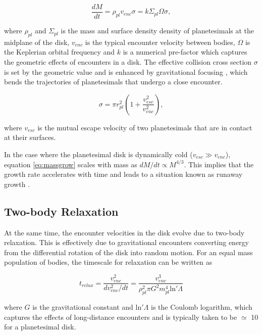 \begin{equation}\label{eq:massgrow}
	\frac{dM}{dt} = \rho_{pl} v_{enc} \sigma = k \Sigma_{pl} \Omega \sigma,
\end{equation}

\noindent where $\rho_{pl}$ and $\Sigma_{pl}$ is the mass and surface density density of planetesimals at the midplane of the disk, $v_{enc}$ is the typical encounter velocity between bodies, $\Omega$ is the Keplerian orbital frequency and $k$ is a numerical pre-factor which captures the geometric effects of encounters in a disk. The effective collision cross section $\sigma$ is set by the geometric value and is enhanced by gravitational focusing \cite{safronov69}, which bends the trajectories of planetesimals that undergo a close encounter.

\begin{equation}\label{eq:gf}
	\sigma = \pi r_{pl}^2 \left( 1 + \frac{v_{esc}^2}{v_{enc}^2} \right),
\end{equation}

\noindent where $v_{esc}$ is the mutual escape velocity of two planetesimals that are in contact at their surfaces.

In the case where the planetesimal disk is dynamically cold ($v_{esc} \gg v_{enc}$), equation \ref{eq:massgrow} scales with mass as $dM/dt \propto M^{4/3}$. This implies that the growth rate accelerates with time and leads to a situation known as runaway growth \cite{wetherill89, kokubo96}.

\subsection{Two-body Relaxation}

At the same time, the encounter velocities in the disk evolve due to two-body relaxation. This is effectively due to gravitational encounters converting energy from the differential rotation of the disk into random motion. For an equal mass population of bodies, the timescale for relaxation can be written as 

\begin{equation}\label{eq:relax}
	t_{relax} = \frac{v_{enc}^2}{d v_{enc}^2 / dt} = \frac{v_{enc}^3}{\rho_{pl}^2 \pi G^{2} m_{pl}^4 \mathrm{ln} ' \Lambda}
\end{equation}

\noindent where $G$ is the gravitational constant and $\mathrm{ln} ' \Lambda$ is the Coulomb logarithm, which captures the effects of long-distance encounters and is typically taken to be $\simeq$ 10 for a planetesimal disk.

